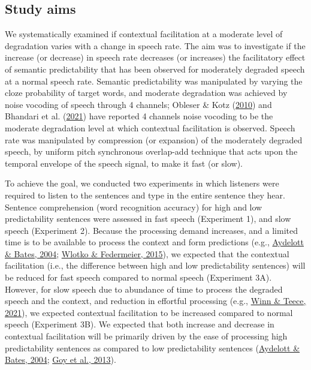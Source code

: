 \documentclass[a4paper, nobind]{templates/ociamthesis}
\begin{document}
\hypertarget{study-aims}{%
\subsection{Study aims}\label{study-aims}}

We systematically examined if contextual facilitation at a moderate level of degradation varies with a change in speech rate.
The aim was to investigate if the increase (or decrease) in speech rate decreases (or increases) the facilitatory effect of semantic predictability that has been observed for moderately degraded speech at a normal speech rate.
Semantic predictability was manipulated by varying the cloze probability of target words, and moderate degradation was achieved by noise vocoding of speech through 4 channels;
Obleser \& Kotz (\protect\hyperlink{ref-Obleser2010}{2010}) and Bhandari et al. (\protect\hyperlink{ref-Bhandari2021}{2021}) have reported 4 channels noise vocoding to be the moderate degradation level at which contextual facilitation is observed.
Speech rate was manipulated by compression (or expansion) of the moderately degraded speech, by uniform pitch synchronous overlap-add technique that acts upon the temporal envelope of the speech signal, to make it fast (or slow).

To achieve the goal, we conducted two experiments in which listeners were required to listen to the sentences and type in the entire sentence they hear.
Sentence comprehension (word recognition accuracy) for high and low predictability sentences were assessed in fast speech (Experiment 1), and slow speech (Experiment 2).
Because the processing demand increases, and a limited time is to be available to process the context and form predictions (e.g., \protect\hyperlink{ref-Aydelott2004}{Aydelott \& Bates, 2004}; \protect\hyperlink{ref-Wlotko2015}{Wlotko \& Federmeier, 2015}), we expected that the contextual facilitation (i.e., the difference between high and low predictability sentences) will be reduced for fast speech compared to normal speech (Experiment 3A).
However, for slow speech due to abundance of time to process the degraded speech and the context, and reduction in effortful processing (e.g., \protect\hyperlink{ref-Winn2021b}{Winn \& Teece, 2021}), we expected contextual facilitation to be increased compared to normal speech (Experiment 3B).
We expected that both increase and decrease in contextual facilitation will be primarily driven by the ease of processing high predictability sentences as compared to low predictability sentences (\protect\hyperlink{ref-Aydelott2004}{Aydelott \& Bates, 2004}; \protect\hyperlink{ref-Goy2013}{Goy et al., 2013}).
\end{document}
